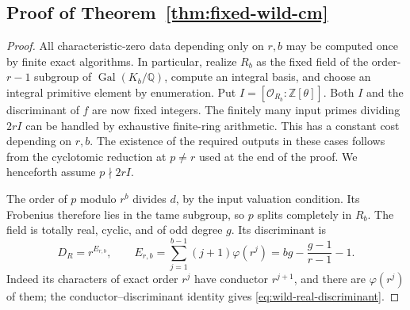 \documentclass[11pt]{article}
\theoremstyle{definition}
\theoremstyle{remark}
\begin{document}
\subsection*{Proof of Theorem~\ref{thm:fixed-wild-cm}}

\begin{proof}
All characteristic-zero data depending only on \(r,b\) may be
computed once by finite exact algorithms. In particular, realize
\(R_b\) as the fixed field of the order-\(r-1\) subgroup of
\(\operatorname{Gal}(K_b/\mathbb Q)\), compute an integral basis,
and choose an integral primitive element by enumeration.
Put \(I=[\mathcal O_{R_b}:\mathbb Z[\theta]]\).
Both \(I\) and the discriminant of \(f\) are now fixed integers.
The finitely many input primes dividing \(2rI\) can be handled
by exhaustive finite-ring arithmetic. This has a constant cost
depending on \(r,b\). The existence of the required outputs in
these cases follows from the cyclotomic reduction at \(p\ne r\)
used at the end of the proof. We henceforth assume \(p\nmid2rI\).

The order of \(p\) modulo \(r^b\) divides \(d\), by the input
valuation condition. Its Frobenius therefore lies in the tame
subgroup, so \(p\) splits completely in \(R_b\). The field is
totally real, cyclic, and of odd degree \(g\). Its discriminant
is
\begin{equation}
 D_R=r^{E_{r,b}},\qquad
 E_{r,b}=\sum_{j=1}^{b-1}(j+1)\varphi(r^j)
        =bg-\frac{g-1}{r-1}-1.
 \label{eq:wild-real-discriminant}
\end{equation}
Indeed its characters of exact order \(r^j\) have conductor
\(r^{j+1}\), and there are \(\varphi(r^j)\) of them; the
conductor--discriminant identity gives \eqref{eq:wild-real-discriminant}.


\end{proof}
\end{document}
